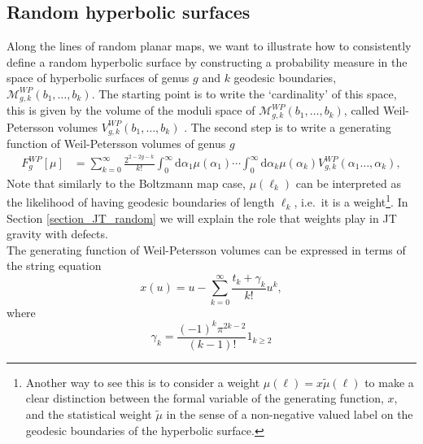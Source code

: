 \documentclass[a4paper,11pt]{article}
\newcommand{\rmd}{\mathrm{d}}
\begin{document}


\subsection{Random hyperbolic surfaces}
Along the lines of random planar maps, we want to illustrate how to consistently define a random hyperbolic surface by constructing a probability measure in the space of hyperbolic surfaces of genus $g$ and $k$ geodesic boundaries, $\mathcal{M}^{WP}_{g,k}(b_1,\dots,b_k)$. The starting point is to write the `cardinality' of this space, this is given by the volume of the moduli space of $\mathcal{M}^{WP}_{g,k}(b_1,\dots,b_k)$, called Weil-Petersson volumes $V^{WP}_{g,k}(b_1,\dots,b_k)$ \cite{Mirzakhani}. The second step is to write a generating function of Weil-Petersson volumes of genus $g$ \cite{1996CMaPh.181..763K}
\begin{align}
	F^{WP}_g[\mu] &= \sum_{k=0}^\infty\frac{2^{2-2g-k}}{k!} \int_{0}^\infty \rmd \alpha_1 \mu(\alpha_1) \cdots \int_{0}^\infty \rmd \alpha_k \mu(\alpha_k) V^{WP}_{g,k}(\alpha_{1}\ldots,\alpha_{k}),
\end{align}
Note that similarly to the Boltzmann map case, $\mu(\ell_k)$ can be interpreted as the likelihood of having geodesic boundaries of length $\ell_k$, i.e.\ it is a weight\footnote{Another way to see this is to consider a weight $\mu(\ell)=x\tilde{\mu}(\ell)$ to make a clear distinction between the formal variable of the generating function, $x$, and the statistical weight $\tilde{\mu}$ in the sense of a non-negative valued label on the geodesic boundaries of the hyperbolic surface.}. In Section \ref{section_JT_random} we will explain the role that weights play in JT gravity with defects.\\
The generating function of Weil-Petersson volumes can be expressed in terms of the string equation 
\begin{equation}
   x(u)=u-\sum_{k=0}^\infty\frac{t_k+\gamma_k}{k!}u^k,\label{eq:string_eq_times}
\end{equation}
where 
\begin{equation}
\gamma_k=\frac{(-1)^k\pi^{2k-2}}{(k-1)!}\mathrm{1}_{k\geq 2}\label{gamma_k}
\end{equation}
\end{document}
